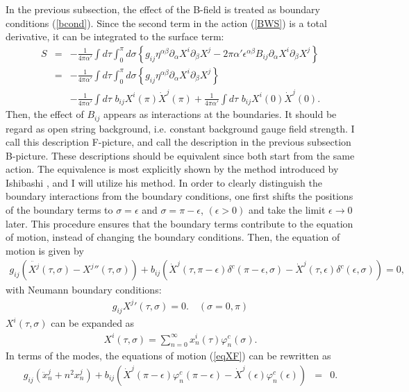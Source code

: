 \documentclass[a4paper,12pt]{article}
\newcommand{\nn}{\nonumber\\}
\newcommand{\pa}{\partial}
\newcommand{\co}{\varphi^c}
\newcommand{\e}{\epsilon}
\begin{document}
In the previous subsection,
the effect of the B-field 
is treated as boundary conditions (\ref{bcond}).
Since
the second term in the action (\ref{BWS})
is a total derivative,
it can be integrated to the surface term:
\begin{eqnarray}
 \label{FWS}
S&=&
-\frac{1}{4\pi\alpha'}
\int d\tau \int_0^{\pi} d\sigma
\left\{
g_{ij} \eta^{\alpha\beta} \pa_\alpha X^i \pa_\beta X^j
-
2\pi\alpha' \epsilon^{\alpha\beta}
B_{ij}\pa_\alpha X^i \pa_\beta X^j \right\} \nn
&=&
-\frac{1}{4\pi\alpha'}
\int d\tau \int_0^{\pi} d\sigma
\left\{
g_{ij} \eta^{\alpha\beta} \pa_\alpha X^i \pa_\beta X^j 
\right\} \nn
&&
-
\frac{1}{4\pi\alpha'}
\int d\tau \, \,
b_{ij}
X^i (\pi) \dot{X}^j (\pi) 
+
\frac{1}{4\pi\alpha'}
\int d\tau \, \,
b_{ij}
X^i (0)\dot{X}^j (0) .
\end{eqnarray}
Then, the effect of $B_{ij}$ appears as 
interactions at the boundaries.
It should be 
regard as
open string background, i.e.
constant background
gauge field strength.
%
%
I call this description F-picture,
and call the description in the
previous subsection
B-picture.
%
%
These descriptions should be
equivalent since both start from
the same action.
The equivalence is most explicitly
shown by
the method introduced by Ishibashi \cite{Ish},
and I will utilize his method.
In order to clearly distinguish the 
boundary interactions
from the boundary conditions,
one first shifts the positions of the
boundary terms to
$\sigma = \e$ and $\sigma = \pi - \e$, $(\e > 0)$
and take the limit $\e \rightarrow 0$ later.
This procedure ensures that the boundary terms
contribute to the equation of motion,
instead of changing the boundary conditions.
Then, the equation of motion is given by
\begin{eqnarray}
 \label{eqXF}
 g_{ij}
\left(
\ddot{X^j}(\tau,\sigma) - {X^j}''(\tau,\sigma)
\right) 
+ b_{ij}
\left(
\dot{X}^j(\tau,\pi-\e) 
\delta^c(\pi-\e,\sigma)
-
\dot{X}^j(\tau,\e) 
\delta^c(\e,\sigma) 
\right) = 0 ,
\end{eqnarray}
with Neumann boundary conditions:
\begin{eqnarray}
 \label{Neu}
g_{ij} {X^j}'(\tau,\sigma) = 0. \quad (\sigma = 0,\pi)
\end{eqnarray}
$X^i(\tau, \sigma)$ can be expanded as
\begin{eqnarray}
 \label{Xmode}
X^i(\tau,\sigma) =
\sum_{n=0}^{\infty}
x^i_n(\tau) \co_n(\sigma).
\end{eqnarray}
In terms of the modes, 
the equations of motion (\ref{eqXF})
can be rewritten as
\begin{eqnarray}
 \label{eqXFmode}
g_{ij} (\ddot{x}_n^j+ n^2x_n^j) +
b_{ij} 
\left(
\dot{X}^j(\pi-\epsilon) \co_n(\pi-\epsilon)
-\dot{X}^j(\epsilon) \co_n(\epsilon)
\right) &=& 0.
\end{eqnarray}
\end{document}

